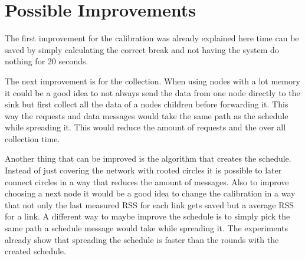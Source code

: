 \section{Possible Improvements}
The first improvement for the calibration was already explained here time can be saved by simply calculating the correct break and not having the system do nothing for 20 seconds.

The next improvement is for the collection. When using nodes with a lot memory it could be a good idea to not always send the data from one node directly to the sink but first collect all the data of a nodes children before forwarding it. This way the requests and data messages would take the same path as the schedule while spreading it. This would reduce the amount of requests and the over all collection time.
 
Another thing that can be improved is the algorithm that creates the schedule. Instead of just covering the network with rooted circles it is possible to later connect circles in a way that reduces the amount of messages. Also to improve choosing a next node it would be a good idea to change the calibration in a way that not only the last measured RSS for each link gets saved but a average RSS for a link.
A different way to maybe improve the schedule is to simply pick the same path a schedule message would take while spreading it. The experiments already show that spreading the schedule is faster than the rounds with the created schedule. 
